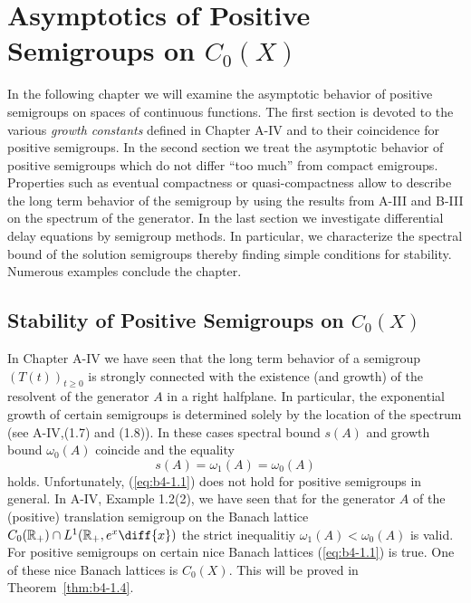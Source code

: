 


\chapter{Asymptotics of Positive Semigroups on $C_{0}(X)$}\label{chap:B-II}



In the following chapter we will examine the asymptotic behavior of positive semigroups on spaces of continuous functions.
The first section is devoted to the various \emph{growth constants} defined in Chapter A-IV and to their coincidence for positive semigroups.
In the second section we treat the asymptotic behavior of positive semigroups which do not differ \enquote{too much} from compact emigroups.
Properties such as eventual compactness or quasi-compactness allow to describe the long term behavior of the semigroup by using the results from A-III and B-III on the spectrum of the generator.
In the last section we investigate differential delay equations by semigroup methods. In particular, we characterize the spectral bound of the solution semigroups thereby finding simple conditions for stability. Numerous examples conclude the chapter.

\section{Stability of Positive Semigroups on $C_0(X)$}\label{sec:b4-1}


In Chapter A-IV we have seen that the long term behavior of a semigroup $(T(t))_{t \geq 0}$ is strongly connected with the existence (and growth) of the resolvent of the generator $A$ in a right halfplane.
In particular, the exponential growth of certain semigroups is determined solely by the location of the spectrum (see A-IV,(1.7) and (1.8)).
In these cases spectral bound $s(A)$ and growth bound $\omega_{0}(A)$ coincide and the equality
\begin{equation}\label{eq:b4-1.1}
   s(A) = \omega_1(A) = \omega_{0}(A)
\end{equation}
holds.
%
%
\newpage
%
Unfortunately, (\ref{eq:b4-1.1}) does not hold for positive semigroups in general.
In A-IV, Example 1.2(2), we have seen that for the generator $A$ of the (positive) translation semigroup on the Banach lattice $C_{0}(\mathbb{R}_+) \cap L^1(\mathbb{R}_+,e^x \diff{x})$ the strict inequalitiy $\omega_1(A) < \omega_{0}(A)$ is valid.
For positive semigroups on certain nice Banach lattices (\ref{eq:b4-1.1}) is true.
One of these nice Banach lattices is $C_{0}(X)$. This will be proved in Theorem~\ref{thm:b4-1.4}.

